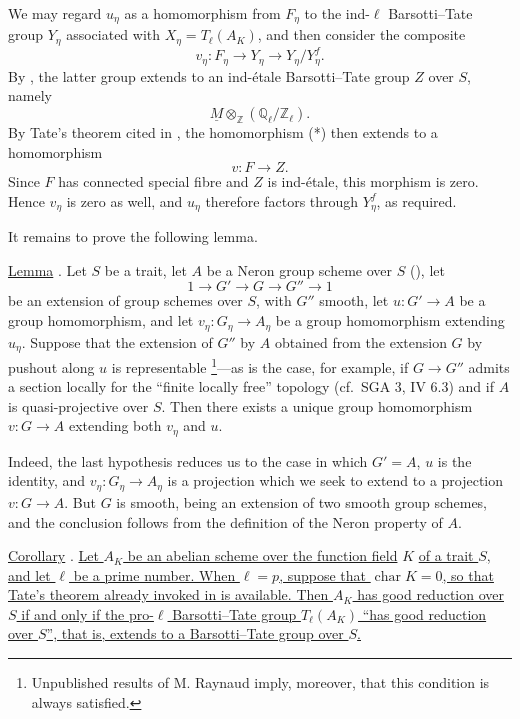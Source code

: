 We may regard $u_\eta$ as a homomorphism from $F_\eta$ to the
ind-$\ell$ Barsotti--Tate group $Y_\eta$ associated with
$X_\eta=T_\ell(A_K)$, and then consider the composite
\begin{equation}\tag{*}
 v_\eta:F_\eta\longrightarrow Y_\eta
 \longrightarrow Y_\eta/Y_\eta^f.
\end{equation}
By , the latter group extends to an ind-\'{e}tale
Barsotti--Tate group $Z$ over $S$, namely
\[
 \underline M\otimes_{\mathbb Z}(\mathbb Q_\ell/\mathbb Z_\ell).
\]
By Tate's theorem cited in , the homomorphism (*) then extends to a
homomorphism
\[
 v:F\longrightarrow Z.
\]
Since $F$ has connected special fibre and $Z$ is ind-\'{e}tale, this
morphism is zero. Hence $v_\eta$ is zero as well, and $u_\eta$
therefore factors through $Y_\eta^f$, as required.

It remains to prove the following lemma.

\medskip
\noindent
\underline{Lemma} . Let $S$ be a trait, let $A$ be
a Neron group scheme over $S$ (), let
\[
 1\longrightarrow G'\longrightarrow G\longrightarrow G''
 \longrightarrow1
\]
be an extension of group schemes over $S$, with $G''$ smooth, let
$u:G'\longrightarrow A$ be a group homomorphism, and let
$v_\eta:G_\eta\longrightarrow A_\eta$ be a group homomorphism
extending $u_\eta$. Suppose that the extension of $G''$ by $A$
obtained from the extension $G$ by pushout along $u$ is representable
\footnote{Unpublished results of M. Raynaud imply, moreover, that this
condition is always satisfied.}---as is the case, for example, if
$G\longrightarrow G''$ admits a section locally for the ``finite
locally free'' topology (cf.\ SGA 3, IV 6.3) and if $A$ is
quasi-projective over $S$. Then there exists a unique group
homomorphism $v:G\longrightarrow A$ extending both $v_\eta$ and $u$.

Indeed, the last hypothesis reduces us to the case in which $G'=A$,
$u$ is the identity, and $v_\eta:G_\eta\longrightarrow A_\eta$ is a
projection which we seek to extend to a projection
$v:G\longrightarrow A$. But $G$ is smooth, being an extension of two
smooth group schemes, and the conclusion follows from the definition
of the Neron property of $A$.

\medskip
\noindent
\underline{Corollary} . \underline{Let $A_K$ be an abelian
scheme over the function field} $K$ \underline{of a trait $S$, and let $\ell$ be
a prime number. When $\ell=p$, suppose that
$\operatorname{char}K=0$, so that Tate's theorem already invoked in
 is available. Then $A_K$ has good reduction over $S$ if and only
if the pro-$\ell$ Barsotti--Tate group $T_\ell(A_K)$ ``has good
reduction over $S$'', that is, extends to a Barsotti--Tate group over
$S$.}

